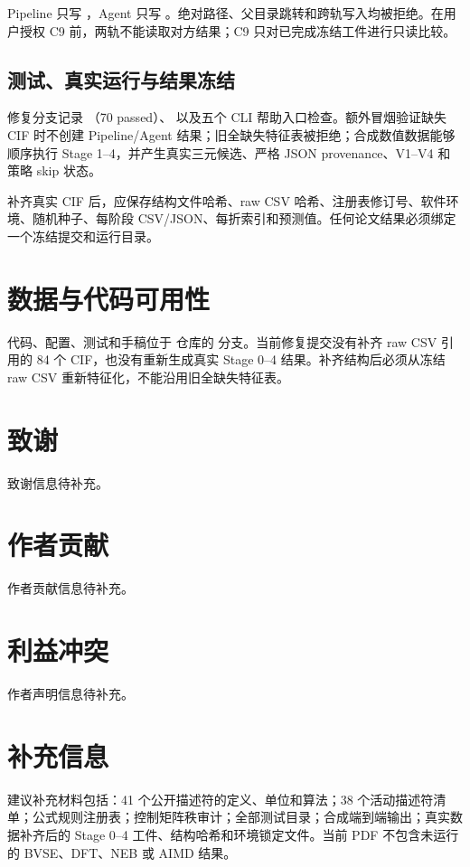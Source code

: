 Pipeline 只写 ，Agent 只写 。绝对路径、父目录跳转和跨轨写入均被拒绝。在用户授权 C9 前，两轨不能读取对方结果；C9 只对已完成冻结工件进行只读比较。

\subsection{测试、真实运行与结果冻结}

修复分支记录 （70 passed）、 以及五个 CLI 帮助入口检查。额外冒烟验证缺失 CIF 时不创建 Pipeline/Agent 结果；旧全缺失特征表被拒绝；合成数值数据能够顺序执行 Stage 1--4，并产生真实三元候选、严格 JSON provenance、V1--V4 和策略 skip 状态。

补齐真实 CIF 后，应保存结构文件哈希、raw CSV 哈希、注册表修订号、软件环境、随机种子、每阶段 CSV/JSON、每折索引和预测值。任何论文结果必须绑定一个冻结提交和运行目录。

\section{数据与代码可用性}

代码、配置、测试和手稿位于  仓库的  分支。当前修复提交没有补齐 raw CSV 引用的 84 个 CIF，也没有重新生成真实 Stage 0--4 结果。补齐结构后必须从冻结 raw CSV 重新特征化，不能沿用旧全缺失特征表。

\section{致谢}

致谢信息待补充。

\section{作者贡献}

作者贡献信息待补充。

\section{利益冲突}

作者声明信息待补充。

\section{补充信息}

建议补充材料包括：41 个公开描述符的定义、单位和算法；38 个活动描述符清单；公式规则注册表；控制矩阵秩审计；全部测试目录；合成端到端输出；真实数据补齐后的 Stage 0--4 工件、结构哈希和环境锁定文件。当前 PDF 不包含未运行的 BVSE、DFT、NEB 或 AIMD 结果。
